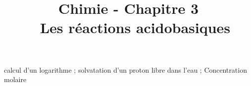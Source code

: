 \documentclass[11pt,a4paper]{article}
\title{\large Chimie - Chapitre 3 \\ \LARGE  Les réactions acidobasiques}
\date{}
\author{}
\begin{document}
\maketitle
\vspace{-1cm}
\begin{tcolorbox}[title=Notions de la classe de première à rappeler]
calcul d'un logarithme ; solvatation d'un proton libre dans l'eau ; Concentration molaire
\end{tcolorbox}
\end{document}
